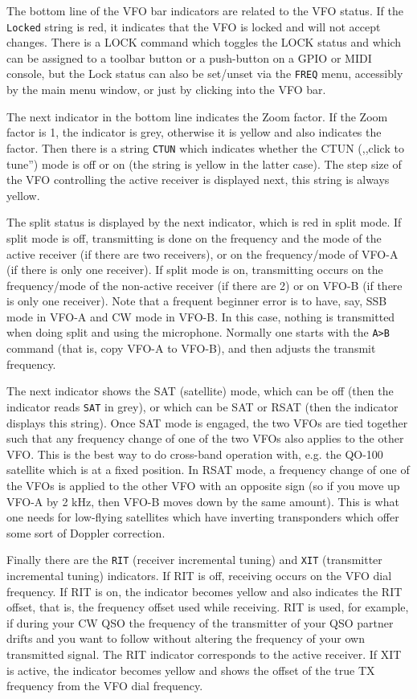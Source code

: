 \documentclass[12pt]{book}
\def\rett#1{\texttt{\color{red}#1}}
\def\bltt#1{\texttt{\color{blue}#1}}
\begin{document}
The bottom line of the VFO bar  indicators are related to the VFO status.
If the \rett{Locked} string is red, it indicates that the VFO is locked
and will not accept changes. There is a LOCK command which toggles the
LOCK status and which can be assigned to a toolbar button or a push-button
on a GPIO or MIDI console, but the Lock status can also be set/unset
via the \bltt{FREQ} menu, accessibly by the main menu window, or just by
clicking into the VFO bar.

The next indicator in the bottom  line indicates the Zoom factor. If the
Zoom factor is 1, the indicator is grey, otherwise it is yellow and
also indicates the factor. Then there is a string \rett{CTUN} which
indicates whether the CTUN (,,click to tune'') mode is off or on (the string
is yellow in the latter case). The step size of the VFO controlling the
active receiver is displayed next, this string is always yellow.

The split status is displayed by the next indicator, which is red in
split mode. If split mode is off, transmitting is done on the frequency
and the mode of the active receiver (if there are two receivers), or
on the frequency/mode of VFO-A (if there is only one receiver). If
split mode is on, transmitting occurs on the frequency/mode of the
non-active receiver (if there are 2) or on VFO-B (if there is only  one
receiver). Note that a frequent beginner error is to have, say,
SSB mode in VFO-A and CW mode in VFO-B. In this case, nothing is
transmitted when doing split and using the microphone. Normally one
starts with the \bltt{A>B} command (that is, copy VFO-A to VFO-B), and
then adjusts the transmit frequency.

The next indicator shows the SAT (satellite) mode, which can be off
(then the indicator reads \rett{SAT} in grey), or which can be SAT or RSAT
(then the indicator displays this string). Once SAT mode is engaged,
the two VFOs are tied together such that any frequency change of one
of the two VFOs also applies to the other VFO. This is the best way
to do cross-band operation with, e.g. the QO-100 satellite which is at
a fixed position. In RSAT mode, a frequency change of one of the VFOs
is applied to the other VFO with an opposite sign (so if you move up
VFO-A by 2 kHz, then VFO-B moves down by the same amount). This is
what one needs for low-flying satellites which have inverting
transponders which offer some sort of Doppler correction.

Finally there are the \rett{RIT} (receiver incremental tuning) and \rett{XIT}
(transmitter incremental tuning) indicators. If RIT is off,
receiving occurs on the VFO dial frequency. If RIT is on, the
indicator becomes yellow and also indicates the RIT offset, that is,
the frequency offset used while receiving. RIT is used, for example,
if during your CW QSO the frequency of the transmitter of your
QSO partner drifts and you want to follow without altering the
frequency of your own transmitted signal. The RIT indicator
corresponds to the active receiver. If XIT is active, the
indicator becomes yellow and shows the offset of the true
TX frequency from the VFO dial frequency.
\end{document}
